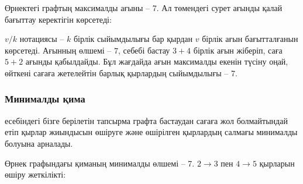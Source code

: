 Өрнектегі графтың максималды ағыны -- 7.
Ал төмендегі сурет ағынды қалай бағыттау
керектігін көрсетеді:

\begin{center}
\end{center}

$v/k$ нотациясы -- $k$ бірлік сыйымдылығы бар
қырдан $v$ бірлік ағын бағытталғанын көрсетеді.  
Ағынның өлшемі -- $7$, себебі бастау $3+4$ бірлік 
ағын жіберіп, саға $5+2$ ағынды қабылдайды. 
Бұл жағдайда ағын максималды екенін түсіну 
оңай, өйткені сағаға жетелейтін барлық 
қырлардың сыйымдылығы -- 7.

\subsubsection{Минималды қима}


 есебіндегі
бізге берілетін тапсырма графта 
бастаудан сағаға жол болмайтындай етіп
қырлар жиындысын өшіруге және өшірілген 
қырлардың салмағы минималды болуына арналады. 

Өрнек графындағы қиманың минималды өлшемі -- 7.
$2 \rightarrow 3$ пен $4 \rightarrow 5$ қырларын
өшіру жеткілікті:

